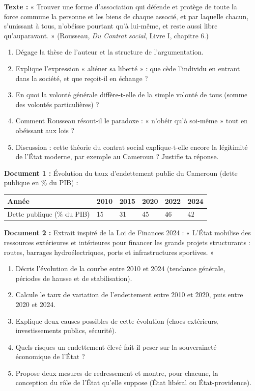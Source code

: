 \documentclass[11pt]{article}
\newcommand{\cle}[1]{{\popxbold\color{popdark}#1}}
\begin{document}
\begin{exercice}
\textbf{Texte :} « Trouver une forme d'association qui défende et protège de toute la force commune la personne et les biens de chaque associé, et par laquelle chacun, s'unissant à tous, n'obéisse pourtant qu'à lui-même, et reste aussi libre qu'auparavant. » (Rousseau, \emph{Du Contrat social}, Livre I, chapitre 6.)
\begin{enumerate}
\item Dégage la thèse de l'auteur et la structure de l'argumentation.
\item Explique l'expression « aliéner sa liberté » : que cède l'individu en entrant dans la société, et que reçoit-il en échange ?
\item En quoi la \cle{volonté générale} diffère-t-elle de la simple volonté de tous (somme des volontés particulières) ?
\item Comment Rousseau résout-il le paradoxe : « n'obéir qu'à soi-même » tout en obéissant aux lois ?
\item Discussion : cette théorie du contrat social explique-t-elle encore la légitimité de l'État moderne, par exemple au Cameroun ? Justifie ta réponse.
\end{enumerate}
\end{exercice}

\begin{exercice}
\textbf{Document 1 :} Évolution du taux d'endettement public du Cameroun (dette publique en \% du PIB) :
\begin{center}
\begin{tabularx}{\linewidth}{|l|X|X|X|X|X|}
\hline
\rowcolor{popblueL} \textbf{Année} & 2010 & 2015 & 2020 & 2022 & 2024 \\
\hline Dette publique (\% du PIB) & 15 & 31 & 45 & 46 & 42 \\
\hline
\end{tabularx}
\end{center}
\textbf{Document 2 :} Extrait inspiré de la Loi de Finances 2024 : « L'État mobilise des ressources extérieures et intérieures pour financer les grands projets structurants : routes, barrages hydroélectriques, ports et infrastructures sportives. »
\begin{enumerate}
\item Décris l'évolution de la courbe entre 2010 et 2024 (tendance générale, périodes de hausse et de stabilisation).
\item Calcule le taux de variation de l'endettement entre 2010 et 2020, puis entre 2020 et 2024.
\item Explique deux causes possibles de cette évolution (chocs extérieurs, investissements publics, sécurité).
\item Quels risques un endettement élevé fait-il peser sur la souveraineté économique de l'État ?
\item Propose deux mesures de redressement et montre, pour chacune, la conception du rôle de l'État qu'elle suppose (État libéral ou État-providence).
\end{enumerate}
\end{exercice}
\end{document}
